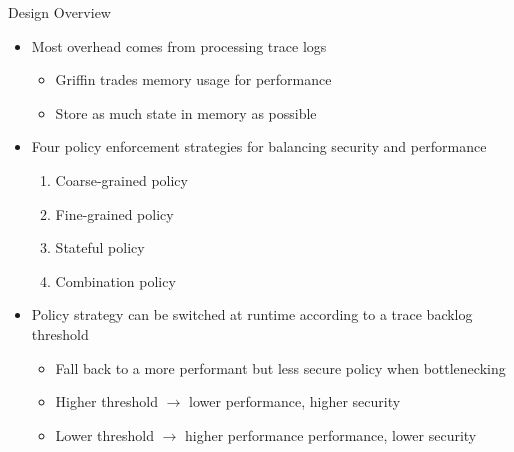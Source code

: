 \documentclass[12pt, dvipsnames, aspectratio=169]{beamer}
\begin{document}
\begin{frame}[c]{Design Overview}{}
  \begin{itemize}
    \item Most overhead comes from processing trace logs
    \begin{itemize}
      \item Griffin trades memory usage for performance
      \item Store as much state in memory as possible
    \end{itemize}

    \vfill
    \item Four policy enforcement strategies for balancing security and performance
    \begin{enumerate}
      \item Coarse-grained policy
      \item Fine-grained policy
      \item Stateful policy
      \item Combination policy
    \end{enumerate}

    \vfill
    \item Policy strategy can be switched at runtime according to a trace backlog threshold
    \begin{itemize}
      \item Fall back to a more performant but less secure policy when bottlenecking
      \item Higher threshold $\rightarrow$ lower performance, higher security
      \item Lower threshold $\rightarrow$ higher performance performance, lower security
    \end{itemize}
  \end{itemize}
\end{frame}
\end{document}
